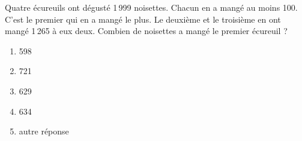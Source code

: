 Quatre écureuils ont dégusté 1\,999 noisettes. Chacun en a mangé au moins 100. C'est le premier qui en a mangé le plus. Le deuxième et le troisième en ont mangé 1\,265 à eux deux. Combien de noisettes a mangé le premier écureuil ?
\begin{multicols}{5}
  \begin{enumerate}[A/]
  \item 598
  \item 721
  \item 629
  \item 634
  \item autre réponse
  \end{enumerate}
\end{multicols}